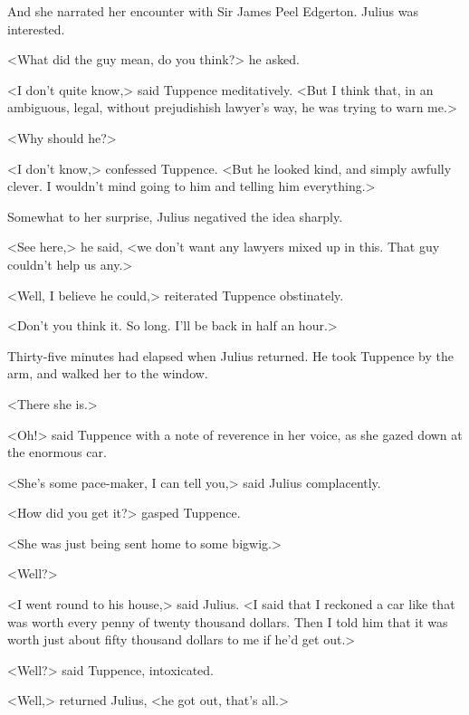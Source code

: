 And she narrated her encounter with Sir James Peel Edgerton. Julius was interested.

<What did the guy mean, do you think?> he asked.

<I don't quite know,> said Tuppence meditatively. <But I think that, in an ambiguous, legal, without prejudishish lawyer's way, he was trying to warn me.>

<Why should he?>

<I don't know,> confessed Tuppence. <But he looked kind, and simply awfully clever. I wouldn't mind going to him and telling him everything.>

Somewhat to her surprise, Julius negatived the idea sharply.

<See here,> he said, <we don't want any lawyers mixed up in this. That guy couldn't help us any.>

<Well, I believe he could,> reiterated Tuppence obstinately.

<Don't you think it. So long. I'll be back in half an hour.>

Thirty-five minutes had elapsed when Julius returned. He took Tuppence by the arm, and walked her to the window.

<There she is.>

<Oh!> said Tuppence with a note of reverence in her voice, as she gazed down at the enormous car.

<She's some pace-maker, I can tell you,> said Julius complacently.

<How did you get it?> gasped Tuppence.

<She was just being sent home to some bigwig.>

<Well?>

<I went round to his house,> said Julius. <I said that I reckoned a car like that was worth every penny of twenty thousand dollars. Then I told him that it was worth just about fifty thousand dollars to me if he'd get out.>

<Well?> said Tuppence, intoxicated.

<Well,> returned Julius, <he got out, that's all.> 